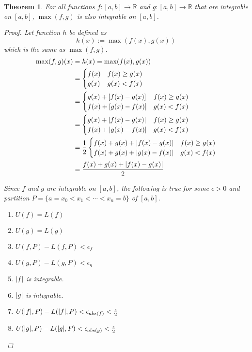 \documentclass[]{article}
\newcommand{\R}{\mathbb{R}}
\newtheorem{theorem}{Theorem}
\begin{document}
\begin{theorem}
    For all functions $f: [a,b] \to \R$ and $g: [a,b] \to \R$ that are integrable on $[a,b]$,
    $\max(f,g)$ is also integrable on $[a,b]$.
    \begin{proof}
        Let function $h$ be defined as\[
            h(x) := \max(f(x),g(x))
        \] which is the same as $\max(f,g)$.
        \begin{align*}
            \max(f,g)(x) 
                &= h(x) = \max(f(x),g(x))\\
                &=\begin{cases}
                    f(x) &f(x) \geq g(x)\\
                    g(x) &g(x) < f(x)
                \end{cases}\\
                &= \begin{cases}
                    g(x) + [f(x) - g(x)] &f(x) \geq g(x)\\
                    f(x) + [g(x) - f(x)] &g(x) < f(x)
                \end{cases}\\
                &= \begin{cases}
                    g(x) + \abs{f(x) - g(x)} &f(x) \geq g(x)\\
                    f(x) + \abs{g(x) - f(x)} &g(x) < f(x)
                \end{cases}\\
                &= \frac{1}{2} \begin{cases}
                    f(x) + g(x) + \abs{f(x) - g(x)} &f(x) \geq g(x)\\
                    f(x) + g(x) + \abs{g(x) - f(x)} &g(x) < f(x)
                \end{cases}\\
                &= \cfrac{f(x) + g(x) + \abs{f(x) - g(x)}}{2}
        \end{align*}

        Since $f$ and $g$ are integrable on $[a,b]$, 
        the following is true for some $\epsilon > 0$ and partition 
        $P = \{a=x_0<x_1<\cdots<x_n=b\}$ of $[a,b]$.%
        \begin{enumerate}
            \item $U(f) = L(f)$
            \item $U(g) = L(g)$
            \item $U(f,P) - L(f,P) < \epsilon_{f}$%
            \item $U(g,P) - L(g,P) < \epsilon_{g}$%
            \item $\abs{f}$ is integrable.
            \item $\abs{g}$ is integrable.
            \item $U(\abs{f},P) - L(\abs{f},P) < \epsilon_{abs(f)} < \frac{\epsilon}{2}$
            \item $U(\abs{g},P) - L(\abs{g},P) < \epsilon_{abs(g)} < \frac{\epsilon}{2}$
        \end{enumerate}


\end{proof}
\end{theorem}
\end{document}
